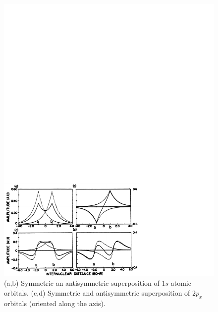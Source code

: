 \begin{figure}
\includegraphics[scale=0.75]{fig2-08}
\caption{(a,b) Symmetric an antisymmetric superposition of $1s$ atomic
orbitals. (c,d) Symmetric and antisymmetric superposition of $2p_x$
orbitals (oriented along the axis).}
\label{fig2-8}
\end{figure}

